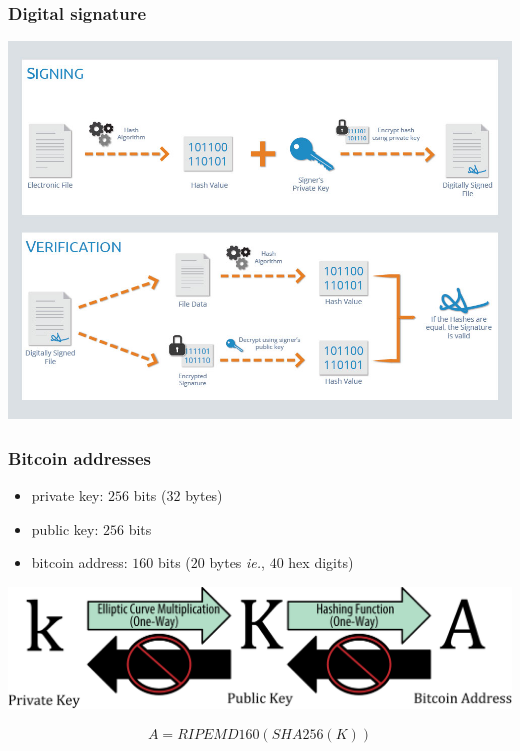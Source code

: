 \documentclass[11pt]{beamer}  %
\begin{document}
\begin{frame}\frametitle{Digital signature}

  \begin{center}
    \includegraphics[scale=0.3,clip=false]{pictures/digital-signatures.jpg}
  \end{center}

\end{frame}

\begin{frame}\frametitle{Bitcoin addresses}

  \begin{itemize}
  \item private key: $256$ bits ($32$ bytes)
  \item public key: $256$ bits
  \item bitcoin address: $160$ bits ($20$ bytes \emph{ie.}, $40$ hex digits)
  \end{itemize}

  \begin{center}
    \includegraphics[scale=1,clip=false]{pictures/mbc2_0401.png}
  \end{center}

  \[A=\mathit{RIPEMD160}(\mathit{SHA256}(K))\]

\end{frame}
\end{document}
